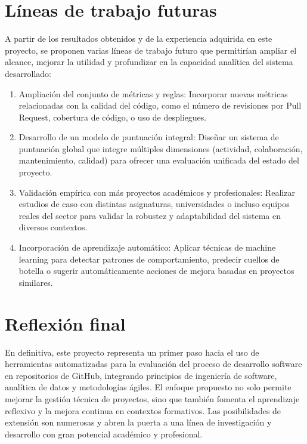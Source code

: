 \section*{Líneas de trabajo futuras}

A partir de los resultados obtenidos y de la experiencia adquirida en este proyecto, se proponen varias líneas de trabajo futuro que permitirían ampliar el alcance, mejorar la utilidad y profundizar en la capacidad analítica del sistema desarrollado:

\begin{enumerate}
\item Ampliación del conjunto de métricas y reglas: Incorporar nuevas métricas relacionadas con la calidad del código, como el número de revisiones por Pull Request, cobertura de código, o uso de despliegues.
\item Desarrollo de un modelo de puntuación integral: Diseñar un sistema de puntuación global que integre múltiples dimensiones (actividad, colaboración, mantenimiento, calidad) para ofrecer una evaluación unificada del estado del proyecto.
\item Validación empírica con más proyectos académicos y profesionales: Realizar estudios de caso con distintas asignaturas, universidades o incluso equipos reales del sector para validar la robustez y adaptabilidad del sistema en diversos contextos.
\item Incorporación de aprendizaje automático: Aplicar técnicas de machine learning para detectar patrones de comportamiento, predecir cuellos de botella o sugerir automáticamente acciones de mejora basadas en proyectos similares.
\end{enumerate}

\section*{Reflexión final}

En definitiva, este proyecto representa un primer paso hacia el uso de herramientas automatizadas para la evaluación del proceso de desarrollo software en repositorios de GitHub, integrando principios de ingeniería de software, analítica de datos y metodologías ágiles. El enfoque propuesto no solo permite mejorar la gestión técnica de proyectos, sino que también fomenta el aprendizaje reflexivo y la mejora continua en contextos formativos. Las posibilidades de extensión son numerosas y abren la puerta a una línea de investigación y desarrollo con gran potencial académico y profesional.